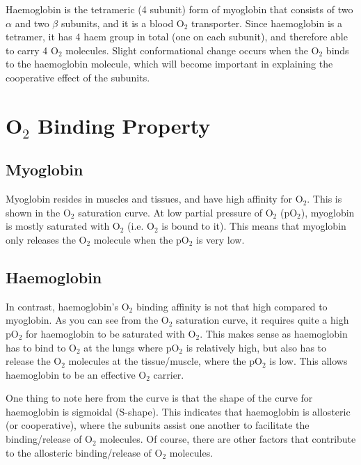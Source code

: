 Haemoglobin is the tetrameric (4 subunit) form of myoglobin that consists of two $\alpha$ and two $\beta$ subunits, and it is a blood O$_2$ transporter.
Since haemoglobin is a tetramer, it has 4 haem group in total (one on each subunit), and therefore able to carry 4 O$_2$ molecules.
Slight conformational change occurs when the O$_2$ binds to the haemoglobin molecule, which will become important in explaining the cooperative effect of the subunits.

\begin{center}
\end{center}

\section{O$_2$ Binding Property}

\subsection{Myoglobin}

Myoglobin resides in muscles and tissues, and have high affinity for O$_2$.
This is shown in the O$_2$ saturation curve.
At low partial pressure of O$_2$ (pO$_2$), myoglobin is mostly saturated with O$_2$ (i.e. O$_2$ is bound to it).
This means that myoglobin only releases the O$_2$ molecule when the pO$_2$ is very low.

\subsection{Haemoglobin}

In contrast, haemoglobin's O$_2$ binding affinity is not that high compared to myoglobin.
As you can see from the O$_2$ saturation curve, it requires quite a high pO$_2$ for haemoglobin to be saturated with O$_2$.
This makes sense as haemoglobin has to bind to O$_2$ at the lungs where pO$_2$ is relatively high, but also has to release the O$_2$ molecules at the tissue/muscle, where the pO$_2$ is low.
This allows haemoglobin to be an effective O$_2$ carrier.

One thing to note here from the curve is that the shape of the curve for haemoglobin is sigmoidal (S-shape).
This indicates that haemoglobin is allosteric (or cooperative), where the subunits assist one another to facilitate the binding/release of O$_2$ molecules.
Of course, there are other factors that contribute to the allosteric binding/release of O$_2$ molecules.

